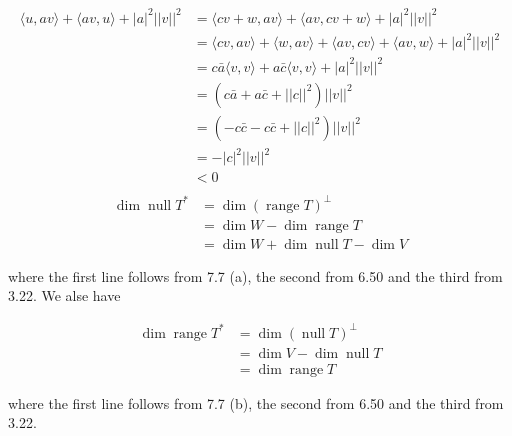 \documentclass[a4paper]{article}
\newcommand\n{\newpage}
\begin{document}
$$ \begin{aligned} \langle u, av \rangle + \langle av, u \rangle + |a|^2 ||v||^2 &= \langle cv + w, av \rangle + \langle av, cv + w \rangle + |a|^2 ||v||^2\\ &= \langle cv, av \rangle + \langle w, av \rangle + \langle av, cv \rangle + \langle av, w \rangle + |a|^2 ||v||^2\\ &= c\bar{a} \langle v, v \rangle + a\bar{c} \langle v, v \rangle + |a|^2 ||v||^2\\ &= (c\bar{a} + a\bar{c} + ||c||^2) ||v||^2\\ &= (-c\bar{c} - c\bar{c} + ||c||^2) ||v||^2\\ &= - |c|^2 ||v||^2\\ &< 0\\ \end{aligned} $$
\n
$$ \begin{aligned} \operatorname{dim} \operatorname{null} T^* &= \operatorname{dim} (\operatorname{range} T)^\perp\\ &= \operatorname{dim} W - \operatorname{dim} \operatorname{range} T\\ &= \operatorname{dim} W + \operatorname{dim} \operatorname{null} T - \operatorname{dim} V \end{aligned} $$

where the first line follows from 7.7 (a), the second from 6.50 and the third from 3.22. We alse have

$$ \begin{aligned} \operatorname{dim} \operatorname{range} T^* &= \operatorname{dim} (\operatorname{null} T)^\perp\\ &= \operatorname{dim} V - \operatorname{dim} \operatorname{null} T\\ &= \operatorname{dim} \operatorname{range} T \end{aligned} $$

where the first line follows from 7.7 (b), the second from 6.50 and the third from 3.22.
\end{document}
